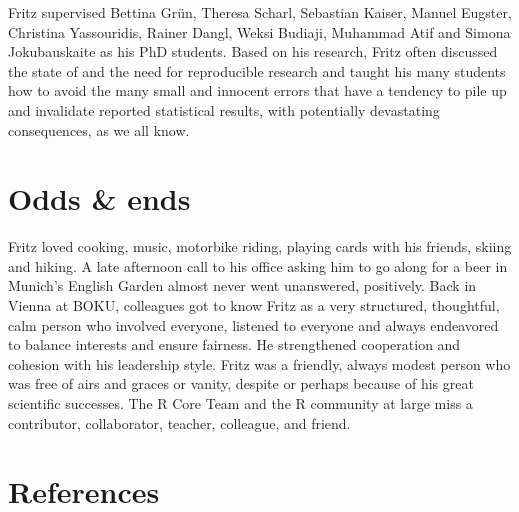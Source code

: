 Fritz supervised
Bettina Grün, Theresa Scharl,
Sebastian Kaiser, Manuel Eugster,
Christina Yassouridis, Rainer Dangl,
Weksi Budiaji, Muhammad Atif and
Simona Jokubauskaite as his PhD students.
Based on his research, Fritz often discussed the state of and the need for reproducible
research and taught his many students how to avoid the many small and
innocent errors that have a tendency to pile up and invalidate reported
statistical results, with potentially devastating consequences, as we all know.

\hypertarget{odds-ends}{%
\section{Odds \& ends}\label{odds-ends}}

Fritz loved cooking, music, motorbike riding, playing cards with his
friends, skiing and hiking. A late afternoon call to his office
asking him to go along for a beer in Munich's English Garden almost never went
unanswered, positively. Back in Vienna at BOKU, colleagues got to know Fritz as a very
structured, thoughtful, calm person who involved everyone, listened to
everyone and always endeavored to balance interests and ensure fairness.
He strengthened cooperation and cohesion with his leadership style.
Fritz was a friendly, always modest person who was free of airs and graces or
vanity, despite or perhaps because of his great scientific successes.
The R Core Team and the R community at large miss a contributor,
collaborator, teacher, colleague, and friend.

\hypertarget{references}{%
\section*{References}\label{references}}

